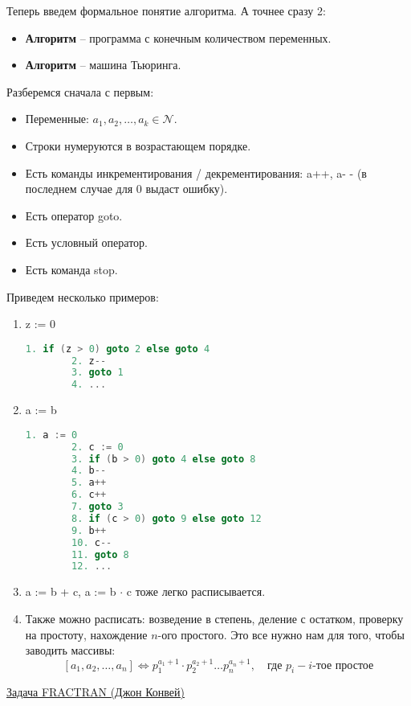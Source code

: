 \vspace{5mm}

Теперь введем формальное понятие алгоритма. А точнее сразу 2: \begin{itemize}
    \item \textbf{Алгоритм} -- программа с конечным количеством переменных.
    \item \textbf{Алгоритм} -- машина Тьюринга.
\end{itemize}
Разберемся сначала с первым: \begin{itemize}
    \item Переменные: $a_1, a_2, \dots, a_k \in \mathcal{N}$.
    \item Строки нумеруются в возрастающем порядке.
    \item Есть команды инкрементирования / декрементирования: a++, a- - (в последнем случае для 0 выдаст ошибку).
    \item Есть оператор goto.
    \item Есть условный оператор.
    \item Есть команда stop.
\end{itemize}
Приведем несколько примеров: \begin{enumerate}
    \item z := 0 \begin{lstlisting}[language=c++]
        1. if (z > 0) goto 2 else goto 4
        2. z--
        3. goto 1
        4. ...
    \end{lstlisting}
    \item a := b \begin{lstlisting}[language=c++]
        1. a := 0
        2. c := 0
        3. if (b > 0) goto 4 else goto 8
        4. b--
        5. a++
        6. c++
        7. goto 3
        8. if (c > 0) goto 9 else goto 12
        9. b++
        10. c--
        11. goto 8
        12. ... 
    \end{lstlisting}
    \item a := b + c, a := b $\cdot$ c тоже легко расписывается.
    \item Также можно расписать: возведение в степень, деление с остатком, проверку на простоту, нахождение $n$-ого простого. Это все нужно нам для того, чтобы заводить массивы: \[ [a_1, a_2, \dots, a_n]  \Leftrightarrow p_1^{a_1 + 1} \cdot p_2^{a_2 + 1} \dots p_n^{a_n + 1}, \quad \text{где } p_i - \text{$i$-тое простое} \]
\end{enumerate}

\underline{Задача FRACTRAN (Джон Конвей)}

